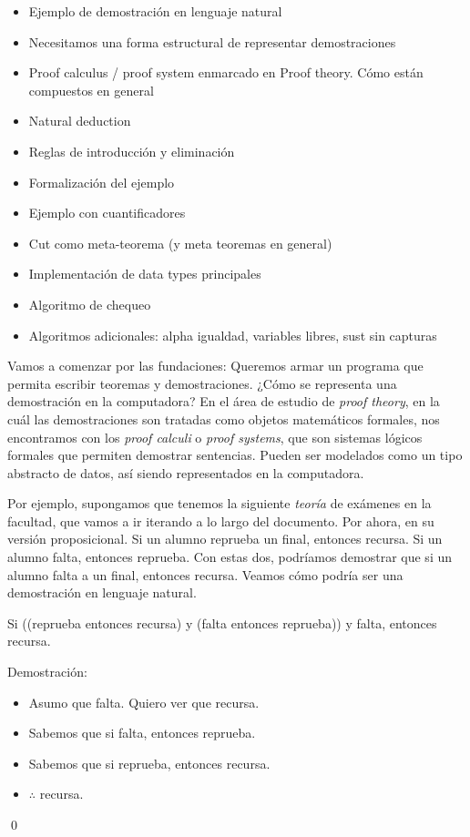 
\begin{itemize}
    \item Ejemplo de demostración en lenguaje natural \checkmark
    \item Necesitamos una forma estructural de representar demostraciones \checkmark
    \item Proof calculus / proof system enmarcado en Proof theory. Cómo están
    compuestos en general \checkmark
    \item Natural deduction \checkmark
    \item Reglas de introducción y eliminación
    \item Formalización del ejemplo \checkmark
    \item Ejemplo con cuantificadores
    \item Cut como meta-teorema (y meta teoremas en general)
    \item Implementación de data types principales \checkmark
    \item Algoritmo de chequeo
    \item Algoritmos adicionales: alpha igualdad, variables libres, sust sin capturas
\end{itemize}

Vamos a comenzar por las fundaciones: Queremos armar un programa que permita
escribir teoremas y demostraciones. ¿Cómo se representa una demostración en la
computadora? En el área de estudio de \textit{proof theory}, en la cuál las
demostraciones son tratadas como objetos matemáticos formales, nos encontramos
con los \textit{proof calculi} o \textit{proof systems}, que son sistemas
lógicos formales que permiten demostrar sentencias. Pueden ser modelados como un
tipo abstracto de datos, así siendo representados en la computadora.

Por ejemplo, supongamos que tenemos la siguiente \textit{teoría} de exámenes en
la facultad, que vamos a ir iterando a lo largo del documento. Por ahora, en su
versión proposicional. Si un alumno reprueba un final, entonces recursa. Si un
alumno falta, entonces reprueba. Con estas dos, podríamos demostrar que si un
alumno falta a un final, entonces recursa. Veamos cómo podría ser una
demostración en lenguaje natural.

\begin{ejemplo}\label{nd:ex:exam}
    Si ((reprueba entonces recursa) y (falta entonces reprueba)) y falta, entonces recursa.

    Demostración:
\begin{itemize}
    \item Asumo que falta. Quiero ver que recursa.
    \item Sabemos que si falta, entonces reprueba.
    \item Sabemos que si reprueba, entonces recursa.
    \item $\therefore$ recursa.
\end{itemize}
    \qed
\end{ejemplo}

